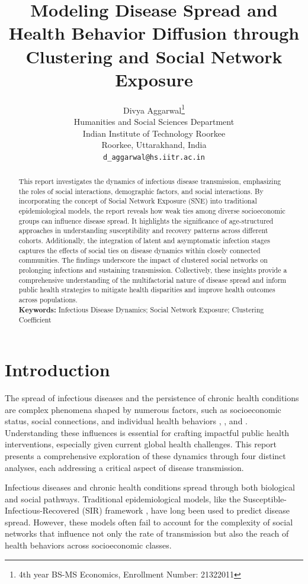 \documentclass[9 pt]{article} %
\title{Modeling Disease Spread and Health Behavior Diffusion through Clustering and Social Network Exposure}
\author{
Divya Aggarwal\thanks{4th year BS-MS Economics, Enrollment Number: 21322011} \\
Humanities and Social Sciences Department\\
Indian Institute of Technology Roorkee \\
Roorkee, Uttarakhand, India \\
\texttt{d\_aggarwal@hs.iitr.ac.in}
}
\begin{document}
\maketitle

\begin{abstract}
This report investigates the dynamics of infectious disease transmission, emphasizing the roles of social interactions, demographic factors, and social interactions. By incorporating the concept of Social Network Exposure (SNE) into traditional epidemiological models, the report reveals how weak ties among diverse socioeconomic groups can influence disease spread. It highlights the significance of age-structured approaches in understanding susceptibility and recovery patterns across different cohorts. Additionally, the integration of latent and asymptomatic infection stages captures the effects of social ties on disease dynamics within closely connected communities. The findings underscore the impact of clustered social networks on prolonging infections and sustaining transmission. Collectively, these insights provide a comprehensive understanding of the multifactorial nature of disease spread and inform public health strategies to mitigate health disparities and improve health outcomes across populations.\\
\textbf{Keywords:} Infectious Disease Dynamics; Social Network Exposure; Clustering Coefficient 
\end{abstract}


\section{Introduction}
\label{headings}
The spread of infectious diseases and the persistence of chronic health conditions are complex phenomena shaped by numerous factors, such as socioeconomic status, social connections, and individual health behaviors \cite{berkman2000social}, \cite{marmot2005social}, and \cite{diezroux2001investigating}. Understanding these influences is essential for crafting impactful public health interventions, especially given current global health challenges. This report presents a comprehensive exploration of these dynamics through four distinct analyses, each addressing a critical aspect of disease transmission.

Infectious diseases and chronic health conditions spread through both biological and social pathways. Traditional epidemiological models, like the Susceptible-Infectious-Recovered (SIR) framework \cite{kermack1927contribution}, have long been used to predict disease spread. However, these models often fail to account for the complexity of social networks that influence not only the rate of transmission but also the reach of health behaviors across socioeconomic classes.
\end{document}
